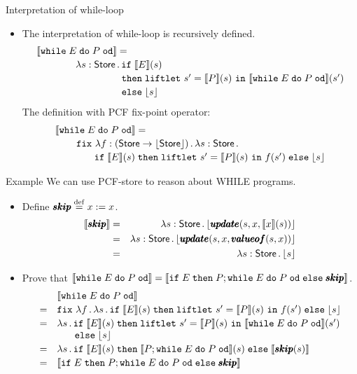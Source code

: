 \documentclass[paper=screen,mode=present,style=zysimple]{powerdot}
\begin{document}
\begin{slide}{Interpretation of while-loop}
\begin{itemize}
\item The interpretation of while-loop is recursively defined.
\[
\begin{array}{l}
\Eval{\cwhile E P} =  
\\[0.2em] \qquad \qquad 
\lambda s : \tstore \ldot \ttif \; \Eval{E}(s) 
\\[0.2em] \hspace*{8.7em}
\ttthen \; \cletst{s'}{\Eval{P} (s)}{\Eval{\cwhile E P} (s')}
\\[0.2em] \hspace*{8.7em}
\ttelse \; \clift s 
\end{array}
\]
The definition with PCF fix-point operator:
\[
\begin{array}{l}
\Eval{\cwhile E P} =  
\\[0.2em] \qquad \, 
\cfix \, \lambda f : (\tstore \to \tlift\tstore) \ldot \lambda s : \tstore \ldot 
\\[0.2em] \qquad \qquad
\ttif \; {\Eval{E}(s)} \; 
\ttthen \; \cletst{s'}{\Eval{P} (s)}{f (s')} \; \ttelse \; \clift{s}
\end{array}
\]
\end{itemize}
\end{slide}

\begin{slide}{Example}
We can use PCF-store to reason about WHILE programs.
\begin{itemize}
\item Define $\pmb{skip} \defeq x := x$.
\vspace*{-0.7em}
\begin{eqnarray*}
\Eval{\pmb{skip}} & = & 
\lambda s : \tstore  \ldot \clift{\cupdate(s, x, \Eval x (s))} 
\\ & = & 
\lambda s : \tstore \ldot \clift{\cupdate(s, x, \cvalof(s, x))}
\\ & = & 
\lambda s : \tstore \ldot \clift{s}
\end{eqnarray*}
\vspace*{-2em}
\item Prove that $\Eval{\cwhile E P} = \Eval{\cif{E}{P; \cwhile E P}{\pmb{skip}}}$.
\vspace*{-0.7em}
\[
\begin{array}{ll}
& \Eval{\cwhile E P} 
\\[0.2em] = &
\cfix \, \lambda f \ldot \lambda s \ldot 
\cif{\Eval E (s)}{\cletst{s'}{\Eval P (s)}{f (s')}}{\clift s}
\\[0.2em] = & 
\lambda s \ldot \ttif \; \Eval E (s) \; \ttthen \; \cletst{s'}{\Eval P (s)}{\Eval{\cwhile E P}(s')}
\\ & \hspace*{1.8em}
\ttelse \; \clift s
\\[0.2em] = & 
\lambda s \ldot \cif{\Eval E (s)}{\Eval{P; \cwhile E P}(s)}{\Eval{\pmb{skip}(s)}}
\\[0.2em] = &
\Eval{\cif{E}{P; \cwhile E P}{\pmb{skip}}}
\end{array}
\]
\end{itemize}
\end{slide}
\end{document}
